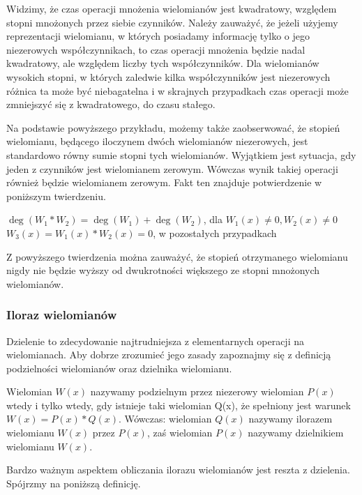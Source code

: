Widzimy, że czas operacji mnożenia wielomianów jest kwadratowy, względem stopni mnożonych przez siebie czynników. Należy zauważyć, że jeżeli użyjemy reprezentacji wielomianu, w których posiadamy informację tylko o jego niezerowych współczynnikach, to czas operacji mnożenia będzie nadal kwadratowy, ale względem liczby tych współczynników. Dla wielomianów wysokich stopni, w których zaledwie kilka współczynników jest niezerowych różnica ta może być niebagatelna i w skrajnych przypadkach czas operacji może zmniejszyć się z kwadratowego, do czasu stałego.

Na podstawie powyższego przykładu, możemy także zaobserwować, że stopień wielomianu, będącego iloczynem dwóch wielomianów niezerowych, jest standardowo równy sumie stopni tych wielomianów. Wyjątkiem jest sytuacja, gdy jeden z czynników jest wielomianem zerowym. Wówczas wynik takiej operacji również będzie wielomianem zerowym. Fakt ten znajduje potwierdzenie w poniższym twierdzeniu.

\begin{theorem}
	$ $\\
	$\deg(W_1 * W_2) = \deg(W_1) + \deg(W_2)$, dla $W_1(x) \neq 0, W_2(x) \neq 0$\\
	$W_3(x) = W_1(x) * W_2(x) = 0$, w pozostałych przypadkach
\end{theorem}

Z powyższego twierdzenia można zauważyć, że stopień otrzymanego wielomianu nigdy nie będzie wyższy od dwukrotności większego ze stopni mnożonych wielomianów.

\subsubsection{Iloraz wielomianów}

Dzielenie to zdecydowanie najtrudniejsza z elementarnych operacji na wielomianach. Aby dobrze zrozumieć jego zasady zapoznajmy się z definicją podzielności wielomianów oraz dzielnika wielomianu.

\begin{definition}
	$ $\\
	Wielomian $W(x)$ nazywamy podzielnym przez niezerowy wielomian $P(x)$ wtedy i tylko wtedy, gdy istnieje taki wielomian Q(x), że spełniony jest warunek $W(x) = P(x) * Q(x)$. Wówczas: wielomian $Q(x)$ nazywamy ilorazem wielomianu $W(x)$ przez $P(x)$, zaś wielomian $P(x)$ nazywamy dzielnikiem wielomianu $W(x)$.
\end{definition}

Bardzo ważnym aspektem obliczania ilorazu wielomianów jest reszta z dzielenia. Spójrzmy na poniższą definicję.

